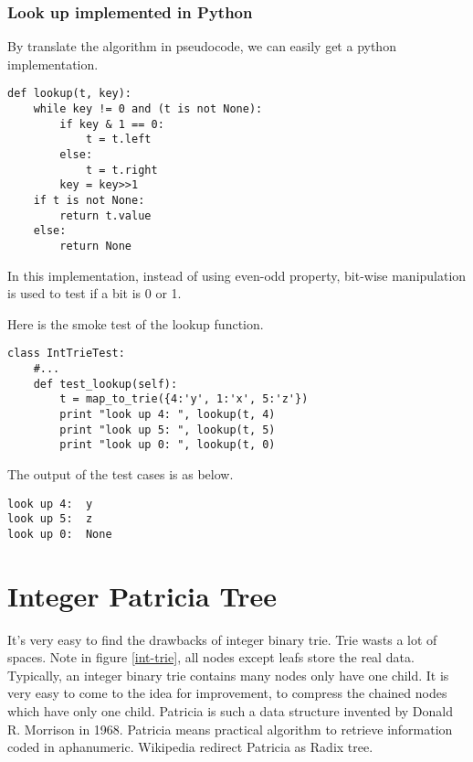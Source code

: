 \documentclass{article}
\begin{document}
\subsubsection*{Look up implemented in Python}
By translate the algorithm in pseudocode, we can easily get a python 
implementation.

\lstset{language=Python}
\begin{lstlisting}
def lookup(t, key):
    while key != 0 and (t is not None):
        if key & 1 == 0:
            t = t.left
        else:
            t = t.right
        key = key>>1
    if t is not None:
        return t.value
    else:
        return None
\end{lstlisting}

In this implementation, instead of using even-odd property, bit-wise
manipulation is used to test if a bit is 0 or 1.

Here is the smoke test of the lookup function.

\begin{lstlisting}
class IntTrieTest:
    #...
    def test_lookup(self):
        t = map_to_trie({4:'y', 1:'x', 5:'z'})
        print "look up 4: ", lookup(t, 4)
        print "look up 5: ", lookup(t, 5)
        print "look up 0: ", lookup(t, 0)
\end{lstlisting}

The output of the test cases is as below.

\begin{verbatim}
look up 4:  y
look up 5:  z
look up 0:  None
\end{verbatim}

\section{Integer Patricia Tree} 
\label{int-patricia}

It's very easy to find the drawbacks of integer binary trie. Trie wasts a lot of 
spaces. Note in figure \ref{int-trie}, all nodes except leafs store the real data.
Typically, an integer binary trie contains many nodes only have one child.
It is very easy to come to the idea for improvement, to compress the chained nodes
which have only one child. Patricia is such a data structure invented by 
Donald R. Morrison in 1968. Patricia means practical algorithm to retrieve information coded
in aphanumeric\cite{patricia-morrison}. Wikipedia redirect Patricia as Radix tree.
\end{document}
